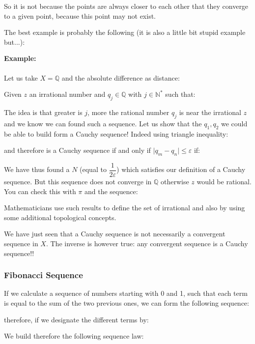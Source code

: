 	So it is not because the points are always closer to each other that they converge to a given point, because this point may not exist.
	
	The best example is probably the following (it is also a little bit stupid example but...):
	\begin{tcolorbox}[colframe=black,colback=white,sharp corners]
\textbf{{\Large {}}Example:}\\\\
Let us take $X=\mathbb{Q}$ and the absolute difference as distance:
	
	Given $z$ an irrational number and $q_j \in \mathbb{Q}$ with $j \in \mathbb{N}^{*}$ such that:
	
	The idea is that greater is $j$, more the rational number $q_j$ is near the irrational $z$ and we know we can found such a sequence.
	Let us show that the $q_1,q_2$ we could be able to build form a Cauchy sequence! Indeed using triangle inequality:
	
	and therefore is a Cauchy sequence if and only if $\vert q_m-q_n \vert\leq \varepsilon$ if:
	
	We have thus found a $N$ (equal to $\dfrac{1}{2\varepsilon}$) which satisfies our definition of a Cauchy sequence. But this sequence does not converge in $\mathbb{Q}$ otherwise $z$ would be rational.
	You can check this with $\pi$ and the sequence:
	
	\end{tcolorbox}
	
	\begin{tcolorbox}[title=Remark,colframe=black,arc=10pt]
Mathematicians use such results to define the set of irrational and also by using some additional topological concepts.
	\end{tcolorbox}
	We have just seen that a Cauchy sequence is not necessarily a convergent sequence in $X$. The inverse is however true: any convergent sequence is a Cauchy sequence!!
	
	\subsubsection{Fibonacci Sequence}
	
	If we calculate a sequence of numbers starting with 0 and 1, such that each term is equal to the sum of the two previous ones, we can form the following sequence:
	
	therefore, if we designate the different terms by:
	
	We build therefore the following sequence law:
	
